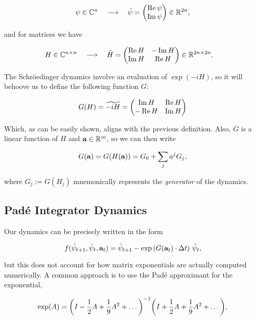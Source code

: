 \documentclass{article}
\newcommand{\isopsi}{\tilde \psi}
\begin{document}
\begin{equation}
  \psi \in \mathbb{C}^n \quad \longrightarrow \quad \isopsi = \mqty(\Re \psi \\ \Im \psi) \in \mathbb{R}^{2n},
\end{equation}

\noindent
and for matrices we have

\begin{align}
  H \in \mathbb{C}^{n \times n} \quad \longrightarrow \quad \tilde{H} &= \mqty(\Re H & -\Im H \\ \Im H & \Re H) \in \mathbb{R}^{2n \times 2n}.
\end{align}

The Schr\"oedinger dynamics involve an evaluation of $\exp(-iH)$, so it will behoove us to define the following function $G$: 

\begin{equation}
  G(H) = \widetilde{-iH} = \mqty(\Im H & \Re H \\ -\Re H & \Im H) 
\end{equation}

\noindent
Which, as can be easily shown, aligns with the previous definition. Also, $G$ is a linear function of $H$ and $\vb{a} \in \mathbb{R}^m$, so we can then write 

\begin{equation}
  G(\vb{a}) = G(H(\vb{a})) = G_0 + \sum_j a^j G_j,
\end{equation}

\noindent
where $G_j := G(H_j)$ mnemonically represents the \textit{generator} of the dynamics.



\subsection{Pad\'e Integrator Dynamics}
Our dynamics can be precisely written in the form 

\begin{equation}
  f(\isopsi_{t+1}, \isopsi_t, \vb{a}_t) = \isopsi_{t+1} - \exp\qty(G(\vb{a}_t) \cdot \Delta t) \ \isopsi_t,
\end{equation}

\noindent
but this does not account for how matrix exponentials are actually computed numerically. A common approach is to use the Pad\'e approximant for the exponential,

\begin{equation}
  \exp(A) = \qty(I - \frac{1}{2} A + \frac{1}{9} A^2 + \dots)^{-1} \qty(I + \frac{1}{2} A + \frac{1}{9} A^2 + \dots),
\end{equation}
\end{document}
